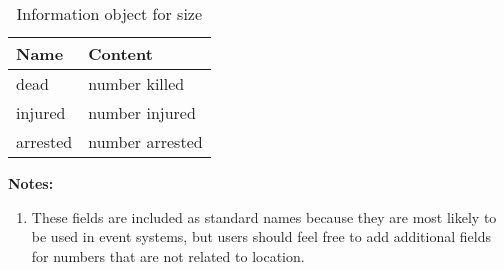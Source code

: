 \documentclass[11pt]{report}
\begin{document}
\begin{table}[htp]
\caption{Information object for size }
\begin{center}
\begin{tabular}{|l|l|}
\hline
Name & Content \\
\hline
dead & number killed \\
injured & number injured \\
arrested & number arrested \\
\hline
\end{tabular}
\end{center}
\label{tab:sizeinfo}
\noindent \textbf{Notes:}
\begin{enumerate}
\item These fields are included as standard names because they are most likely to be used in event systems, but users should feel free to add additional fields for numbers that are not related to location.
\end{enumerate}
\end{table}%
\end{document}
